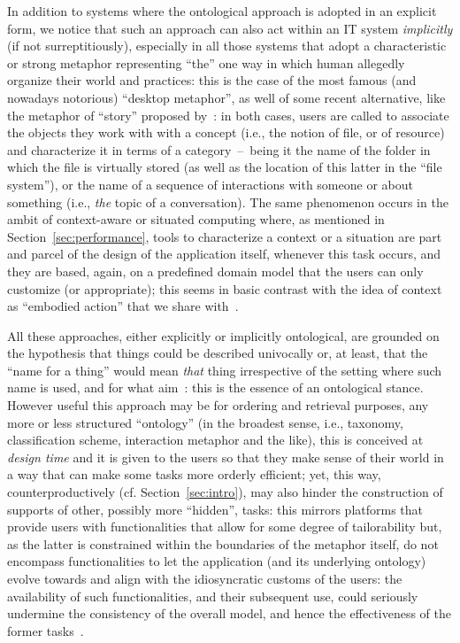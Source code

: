 \documentclass{article}
\begin{document}
In addition to systems where the ontological approach is adopted in an explicit form, we notice that such an approach can also act within an IT system \emph{implicitly} (if not surreptitiously), especially in all those systems that adopt a characteristic or strong metaphor representing ``the'' one way in which human allegedly organize their world and practices: this is the case of the most famous (and nowadays notorious) ``desktop metaphor'', as well of some recent alternative, like the metaphor of ``story'' proposed by~\citet{de_michelis_itsme:_2009}: in both cases, users are called to associate the objects they work with with a concept (i.e., the notion of file, or of resource) and characterize it in terms of a category~--~being it the name of the folder in which the file is virtually stored (as well as the location of this latter in the ``file system''), or the name of a sequence of interactions with someone or about something (i.e., \emph{the} topic of a conversation). The same phenomenon occurs in the ambit of context-aware or situated computing where, as mentioned in Section~\ref{sec:performance}, tools to characterize a context or a situation are part and parcel of the design of the application itself, whenever this task occurs, and they are based, again, on a predefined domain model that the users can only customize (or appropriate); this seems in basic contrast with the idea of context as ``embodied action'' that we share with~\citet{dourish_what_2004}.

All these approaches, either explicitly or implicitly ontological, are grounded on the hypothesis that things could be described univocally or, at least, that the ``name for a thing'' would mean \emph{that} thing irrespective of the setting where such name is used, and for what aim~\citep[cf. e.g.~][]{mark_reconciling_2002,anderson_down_2008}: this is the essence of an ontological stance. However useful this approach may be for ordering and retrieval purposes, any more or less structured ``ontology'' (in the broadest sense, i.e., taxonomy, classification scheme, interaction metaphor and the like), this is conceived at \emph{design time} and it is given to the users so that they make sense of their world in a way that can make some tasks more orderly efficient; yet, this way, counterproductively (cf. Section~\ref{sec:intro}), may also hinder the construction of supports of other, possibly more ``hidden'', tasks: this mirrors platforms that provide users with functionalities that allow for some degree of tailorability but, as the latter is constrained within the boundaries of the metaphor itself, do not encompass functionalities to let the application (and its underlying ontology) evolve towards and align with the idiosyncratic customs of the users: the availability of such functionalities, and their subsequent use, could seriously undermine the consistency of the overall model, and hence the effectiveness of the former tasks~\citep[e.g.,~][]{peters_against_2006}.  
\end{document}
